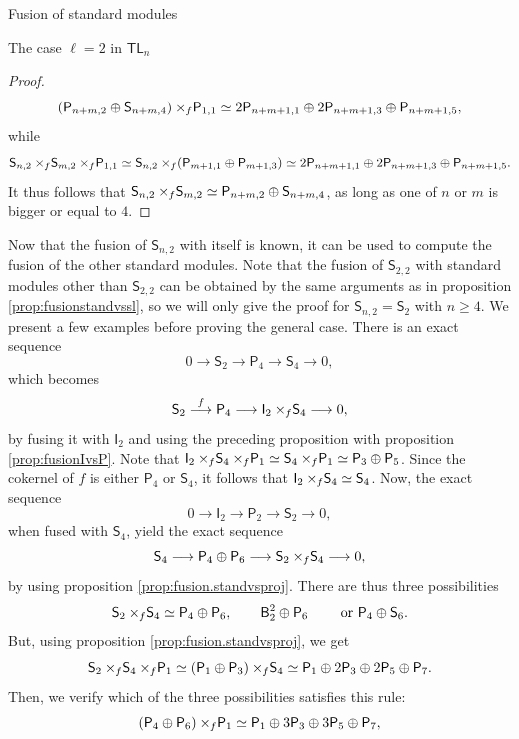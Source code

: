\documentclass[reqno]{amsart}
\newcommand{\tl}[1]{\mathsf{TL}_{#1}}
\newcommand{\ds}[1]{\mathsf S_{#1}}
\newcommand{\dl}[1]{\mathsf I_{#1}}
\newcommand{\dP}[1]{\mathsf P_{#1}}
\newcommand{\xf}{\times\hspace{-0.27em}_f}
\newcommand{\B}[2]{\mathsf{B}^{#1}_{#2}}
\newcommand{\lc}{\ell}
\begin{document}
\begin{section}{Fusion of standard modules}
\begin{subsection}{The case $\lc =2$ in $\tl{n}$}
\begin{proof}
\begin{equation*}
(\dP{n+m,2} \oplus \ds{n+m,4})\xf \dP{1,1} \simeq 2\dP{n+m+1,1} \oplus 2\dP{n+m+1,3} \oplus \dP{n+m+1,5},
\end{equation*}
while $$\ds{n,2} \xf \ds{m,2} \xf \dP{1,1} \simeq \ds{n,2} \xf (\dP{m+1,1} \oplus \dP{m+1,3}) \simeq 2\dP{n+m+1,1} \oplus 2\dP{n+m+1,3} \oplus \dP{n+m+1,5}.$$
It thus follows that $\ds{n,2}\xf \ds{m,2} \simeq \dP{n+m,2} \oplus \ds{n+m,4}$, as long as one of $n$ or $m$ is bigger or equal to $4$. 
\end{proof}
Now that the fusion of $\ds{n,2}$ with itself is known, it can be used to compute the fusion of the other standard modules. Note that the fusion of $\ds{2,2}$ with standard modules other than $\ds{2,2}$ can be obtained by the same arguments as in proposition \ref{prop:fusionstandvssl}, so we will only give the proof for $\ds{n,2} = \ds{2}$ with $n\geq 4$. We present a few examples before proving the general case. There is an exact sequence $$0 \longrightarrow \ds{2} \longrightarrow \dP{4} \longrightarrow \ds{4} \longrightarrow 0, $$
which becomes
\begin{equation}
\ds{2} \overset{f}{\longrightarrow} \dP{4} \longrightarrow \dl{2} \xf \ds{4} \longrightarrow 0,
\end{equation}
by fusing it with $\dl{2}$ and using the preceding proposition with proposition \ref{prop:fusionIvsP}. Note that $\dl{2} \xf \ds{4} \xf \dP{1} \simeq \ds{4}\xf \dP{1} \simeq \dP{3} \oplus \dP{5}$. Since the cokernel of $f$ is either $\dP{4}$ or $\ds{4}$, it follows that $\dl{2} \xf \ds{4} \simeq \ds{4}$. Now, the exact sequence $$0 \longrightarrow \dl{2} \longrightarrow \dP{2} \longrightarrow \ds{2} \longrightarrow 0, $$
when fused with $\ds{4}$, yield the exact sequence
$$\ds{4} \longrightarrow \dP{4} \oplus \dP{6} \longrightarrow \ds{2} \xf \ds{4} \longrightarrow 0, $$ by using proposition \ref{prop:fusion.standvsproj}. There are thus three possibilities
$$\ds{2} \xf \ds{4} \simeq \dP{4} \oplus \dP{6}, \qquad \B{2}{2} \oplus \dP{6} \qquad \text{ or } \dP{4} \oplus \ds{6}. $$ 
But, using proposition \ref{prop:fusion.standvsproj}, we get
$$\ds{2} \xf \ds{4} \xf \dP{1} \simeq (\dP{1} \oplus \dP{3})\xf \ds{4} \simeq \dP{1} \oplus 2\dP{3} \oplus 2\dP{5} \oplus \dP{7}.$$
Then, we verify which of the three possibilities satisfies this rule:
\begin{equation*}
(\dP{4} \oplus \dP{6}) \xf \dP{1} \simeq \dP{1} \oplus 3\dP{3} \oplus 3\dP{5} \oplus \dP{7},
\end{equation*}
\begin{equation*}

\end{equation*}
\end{subsection}
\end{section}
\end{document}
